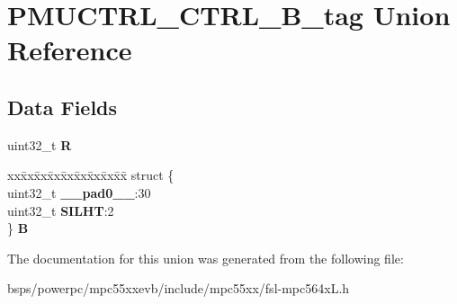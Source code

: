 \hypertarget{unionPMUCTRL__CTRL__32B__tag}{}\section{P\+M\+U\+C\+T\+R\+L\+\_\+\+C\+T\+R\+L\+\_\+B\+\_\+tag Union Reference}
\label{unionPMUCTRL__CTRL__32B__tag}
\subsection*{Data Fields}
\begin{DoxyCompactItemize}
\item 
\mbox{\label{unionPMUCTRL__CTRL__32B__tag_a3a15b3ef19a9a8ef9e7cb21f71c4268d}} 
uint32\+\_\+t {\bfseries R}
\item 
\mbox{\label{unionPMUCTRL__CTRL__32B__tag_a45f657983d9b190a68f4b1256e5ee8f8}} 
\begin{tabbing}
xx\=xx\=xx\=xx\=xx\=xx\=xx\=xx\=xx\=\kill
struct \{\\
\>uint32\_t {\bfseries \_\_pad0\_\_}:30\\
\>uint32\_t {\bfseries SILHT}:2\\
\} {\bfseries B}\\

\end{tabbing}\end{DoxyCompactItemize}


The documentation for this union was generated from the following file\+:\begin{DoxyCompactItemize}
\item 
bsps/powerpc/mpc55xxevb/include/mpc55xx/fsl-\/mpc564x\+L.\+h\end{DoxyCompactItemize}
